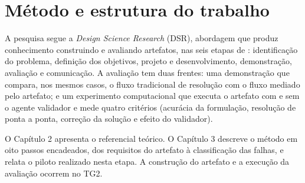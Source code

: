 \section{Método e estrutura do trabalho}
\label{sec:metodologia-pesquisa}

A pesquisa segue a \textit{Design Science Research} (DSR), abordagem que produz conhecimento construindo e avaliando artefatos, nas seis etapas de : identificação do problema, definição dos objetivos, projeto e desenvolvimento, demonstração, avaliação e comunicação. A avaliação tem duas frentes: uma demonstração que compara, nos mesmos casos, o fluxo tradicional de resolução com o fluxo mediado pelo artefato; e um experimento computacional que executa o artefato com e sem o agente validador e mede quatro critérios (acurácia da formulação, resolução de ponta a ponta, correção da solução e efeito do validador).

O Capítulo 2 apresenta o referencial teórico. O Capítulo 3 descreve o método em oito passos encadeados, dos requisitos do artefato à classificação das falhas, e relata o piloto realizado nesta etapa. A construção do artefato e a execução da avaliação ocorrem no TG2.
